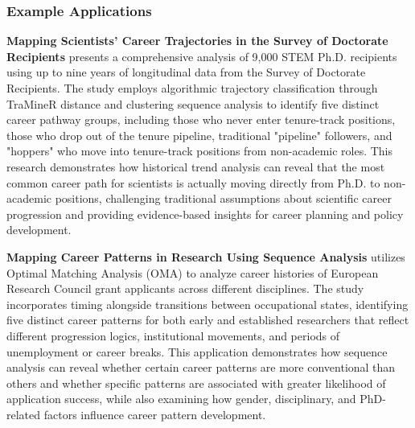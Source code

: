 \documentclass[../main.tex]{subfiles}
\begin{document}
\subsubsection{Example Applications}


\textbf{Mapping Scientists' Career Trajectories in the Survey of Doctorate Recipients} \parencite{nature2023} presents a comprehensive analysis of 9,000 STEM Ph.D. recipients using up to nine years of longitudinal data from the Survey of Doctorate Recipients. The study employs algorithmic trajectory classification through TraMineR distance and clustering sequence analysis to identify five distinct career pathway groups, including those who never enter tenure-track positions, those who drop out of the tenure pipeline, traditional "pipeline" followers, and "hoppers" who move into tenure-track positions from non-academic roles. This research demonstrates how historical trend analysis can reveal that the most common career path for scientists is actually moving directly from Ph.D. to non-academic positions, challenging traditional assumptions about scientific career progression and providing evidence-based insights for career planning and policy development.


\textbf{Mapping Career Patterns in Research Using Sequence Analysis} \parencite{pmc2020} utilizes Optimal Matching Analysis (OMA) to analyze career histories of European Research Council grant applicants across different disciplines. The study incorporates timing alongside transitions between occupational states, identifying five distinct career patterns for both early and established researchers that reflect different progression logics, institutional movements, and periods of unemployment or career breaks. This application demonstrates how sequence analysis can reveal whether certain career patterns are more conventional than others and whether specific patterns are associated with greater likelihood of application success, while also examining how gender, disciplinary, and PhD-related factors influence career pattern development.

\end{document}
